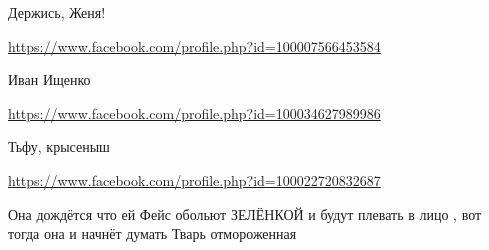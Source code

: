 \documentclass[a4paper,11pt]{extreport}
\begin{document}
\begin{itemize}
Держись, Женя!

\url{https://www.facebook.com/profile.php?id=100007566453584}

Иван Ищенко

\url{https://www.facebook.com/profile.php?id=100034627989986}

Тьфу, крысеныш

\url{https://www.facebook.com/profile.php?id=100022720832687}

Она дождётся что ей Фейс обольют ЗЕЛЁНКОЙ и будут плевать в лицо , вот тогда она и начнёт думать Тварь отмороженная

\end{itemize}
\end{document}
